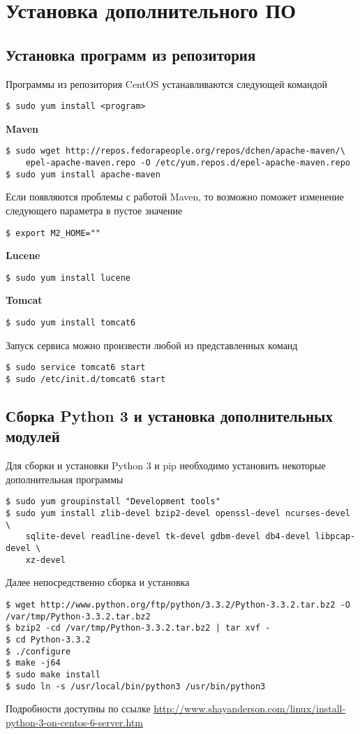 \chapter{Установка дополнительного ПО}
\section{Установка программ из репозитория}
Программы из репозитория CentOS устанавливаются следующей командой
\begin{lstlisting}
$ sudo yum install <program>
\end{lstlisting}

\textbf{Maven}
\begin{lstlisting}
$ sudo wget http://repos.fedorapeople.org/repos/dchen/apache-maven/\
    epel-apache-maven.repo -O /etc/yum.repos.d/epel-apache-maven.repo
$ sudo yum install apache-maven
\end{lstlisting}
Если появляются проблемы с работой Maven, то возможно поможет изменение следующего параметра 
в пустое значение
\begin{lstlisting}
$ export M2_HOME=""
\end{lstlisting} 

\textbf{Lucene}
\begin{lstlisting}
$ sudo yum install lucene
\end{lstlisting}

\textbf{Tomcat}
\begin{lstlisting}
$ sudo yum install tomcat6
\end{lstlisting}
Запуск сервиса можно произвести любой из представленных команд
\begin{lstlisting}
$ sudo service tomcat6 start
$ sudo /etc/init.d/tomcat6 start
\end{lstlisting}

\section{Сборка Python 3 и установка дополнительных модулей}
Для сборки и установки Python 3 и pip необходимо установить некоторые дополнительная программы
\begin{lstlisting}
$ sudo yum groupinstall "Development tools"
$ sudo yum install zlib-devel bzip2-devel openssl-devel ncurses-devel \
    sqlite-devel readline-devel tk-devel gdbm-devel db4-devel libpcap-devel \
    xz-devel
\end{lstlisting}
Далее непосредственно сборка и установка
\begin{lstlisting}
$ wget http://www.python.org/ftp/python/3.3.2/Python-3.3.2.tar.bz2 -O /var/tmp/Python-3.3.2.tar.bz2
$ bzip2 -cd /var/tmp/Python-3.3.2.tar.bz2 | tar xvf -
$ cd Python-3.3.2
$ ./configure
$ make -j64
$ sudo make install
$ sudo ln -s /usr/local/bin/python3 /usr/bin/python3
\end{lstlisting}
Подробности доступны по ссылке \url{http://www.shayanderson.com/linux/install-python-3-on-centos-6-server.htm}

